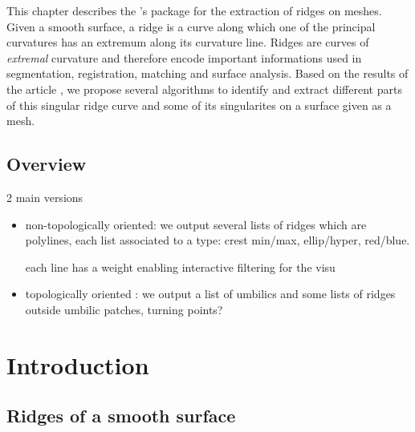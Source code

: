 This chapter describes the \cgal's package for the extraction of
ridges on meshes.  Given a smooth surface, a ridge is a curve along
which one of the principal curvatures has an extremum along its
curvature line. Ridges are curves of {\em extremal} curvature and
therefore encode important informations used in segmentation,
registration, matching and surface analysis.  Based on the results of
the article \cite{rr}, we propose several algorithms to identify and
extract different parts of this singular ridge curve and some of its
singularites on a surface given as a mesh.


\subsection{Overview}

2 main versions

\begin{itemize}
\item
non-topologically oriented: we output several lists of ridges which
are polylines, each list associated to a type: crest min/max,
ellip/hyper, red/blue.

each line has a weight enabling interactive filtering for the visu

\item
topologically oriented : we output a list of umbilics and some lists
of ridges outside umbilic patches, turning points?
\end{itemize}


\section{Introduction}
\label{sec:intro}

\subsection{Ridges of a smooth surface}

